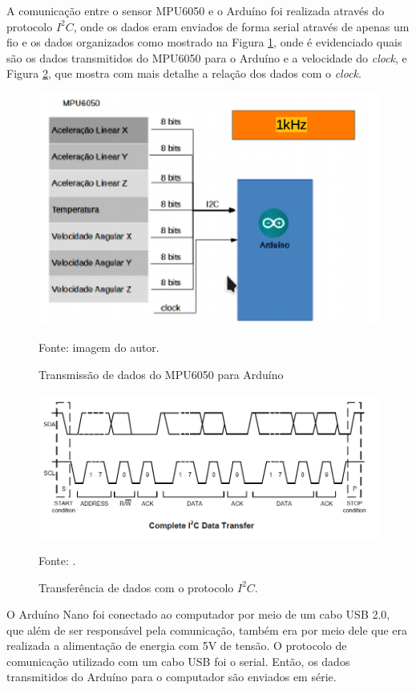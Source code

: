 		A comunicação entre o sensor MPU6050 e o Arduíno foi realizada através do protocolo $I^2C$, onde os dados eram enviados de forma serial através de apenas um fio e os dados organizados como mostrado na Figura \ref{comunicacao}, onde é evidenciado quais são os dados transmitidos do MPU6050 para o Arduíno e a velocidade do \textit{clock}, e Figura \ref{i2c}, que mostra com mais detalhe a relação dos dados com o \textit{clock}.
		
		\begin{figure}[h]
			\centering
			\includegraphics[keepaspectratio=true,scale=1]{figuras/comunicacao.PNG}
			\caption{ Transmissão de dados do MPU6050 para Arduíno}
			Fonte: imagem do autor. 
			\label{comunicacao}	
		\end{figure}
		
		\begin{figure}[h]
			\centering
			\includegraphics[keepaspectratio=true,scale=0.5]{figuras/i2c.PNG}
			\caption{Transferência de dados com o protocolo $I^2C$. }
			Fonte: \cite{mpu6050}. 
			\label{i2c}	
		\end{figure}
	
		O Arduíno Nano foi conectado ao computador por meio de um cabo USB 2.0, que além de ser responsável pela comunicação, também era por meio dele que era realizada a alimentação de energia com 5V de tensão. O protocolo de comunicação utilizado com um cabo USB  foi o serial. Então, os dados transmitidos do Arduíno para o computador são enviados em série. 
		
